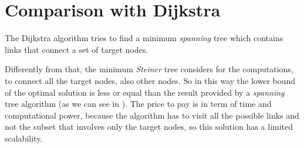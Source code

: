 \section{Comparison with Dijkstra}\label{sec:comparison}

The Dijkstra algorithm tries to find a minimum \emph{spanning} tree which
contains links that connect a set of target nodes.

Differently from that, the minimum \emph{Steiner} tree considers for the
computations, to connect all the target nodes, also other nodes. So in this way
the lower bound of the optimal solution is less or equal than the result
provided by a \emph{spanning} tree algorithm (as we can see in
). The price to pay is in term of time and computational
power, because the algorithm has to visit all the possible links and not the
subset that involves only the target nodes, so this solution has a limited
scalability.

